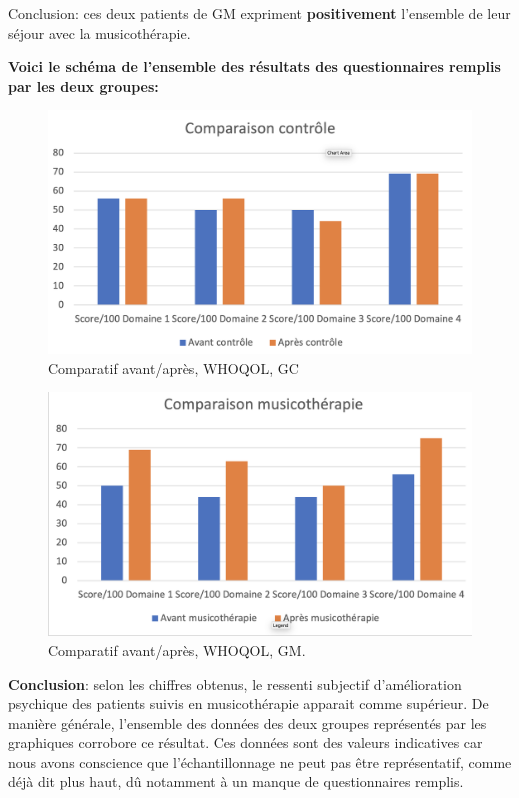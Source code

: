 \begin{enumerate}
                 Conclusion: ces deux patients de GM expriment
                 \textbf{positivement }
                 l'ensemble de leur séjour avec la musicothérapie.

               \textbf{  Voici le schéma de l'ensemble des résultats des
                 questionnaires remplis par les deux groupes:}
                
\begin{figure}
\centering
\includegraphics[width=0.7\linewidth]{images/Compcontrole.png}
\caption[Schéma du déroulement]{Comparatif avant/après, 
  WHOQOL, GC}
       
\label{groupecontroleimage1}
\end{figure}

\begin{figure}
\centering
\includegraphics[width=0.7\linewidth]{images/Compmusico.png}
\caption[Schéma du déroulement]{Comparatif  avant/après, WHOQOL, GM.}
       
\label{groupecontroleimage1}
\end{figure}



       \textbf{ Conclusion}: selon les chiffres obtenus, le ressenti
       subjectif d'amélioration psychique 
        des patients suivis en musicothérapie apparait comme
        supérieur.
        De manière générale, l'ensemble des données des deux groupes représentés
        par les graphiques corrobore ce résultat.
        Ces données sont des valeurs indicatives car nous avons conscience que l'échantillonnage ne
        peut pas être représentatif, comme déjà dit plus haut, dû
        notamment à un
        manque de
        questionnaires remplis.

\end{enumerate}
